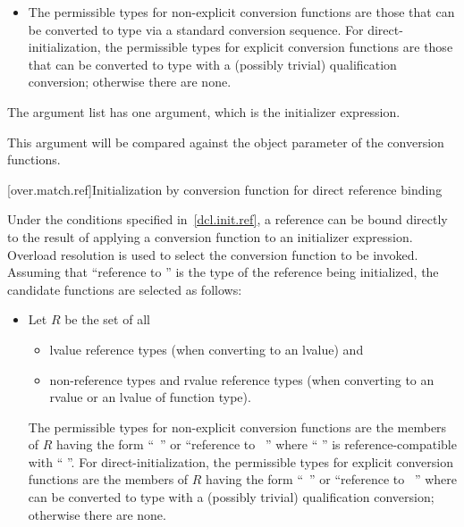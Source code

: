 \begin{itemize}
\item
The permissible types for non-explicit conversion functions are
those that can be converted to type 
via a standard conversion sequence.
For direct-initialization,
the permissible types for explicit conversion functions are
those that can be converted to type 
with a (possibly trivial) qualification conversion;
otherwise there are none.
\end{itemize}

\pnum
The argument list has one argument, which is the initializer expression.
\begin{note}
This argument will be compared against
the object parameter of the conversion functions.
\end{note}

[over.match.ref]{Initialization by conversion function for direct reference binding}%

\pnum
Under the conditions specified in~\ref{dcl.init.ref}, a reference can be bound directly
to the result of applying a conversion
function to an initializer expression.
Overload resolution is used to select the
conversion function to be invoked.
Assuming that ``reference to  '' is the
type of the reference being initialized,
the candidate functions are selected as follows:
\begin{itemize}
\item
Let $R$ be the set of all
\begin{itemize}
\item
lvalue reference types
(when converting to an lvalue) and
\item
non-reference types and rvalue reference types
(when converting to an rvalue or an lvalue of function type).
\end{itemize}
The permissible types for non-explicit conversion functions are
the members of $R$
having the form ``\cv{}~'' or ``reference to ~''
where `` '' is reference-compatible
with `` ''.
For direct-initialization, the permissible types for explicit
conversion functions are the members of $R$
having the form ``\cv{}~'' or ``reference to ~''
where  can be converted to type 
with a (possibly trivial) qualification conversion;
otherwise there are none.
\end{itemize}

